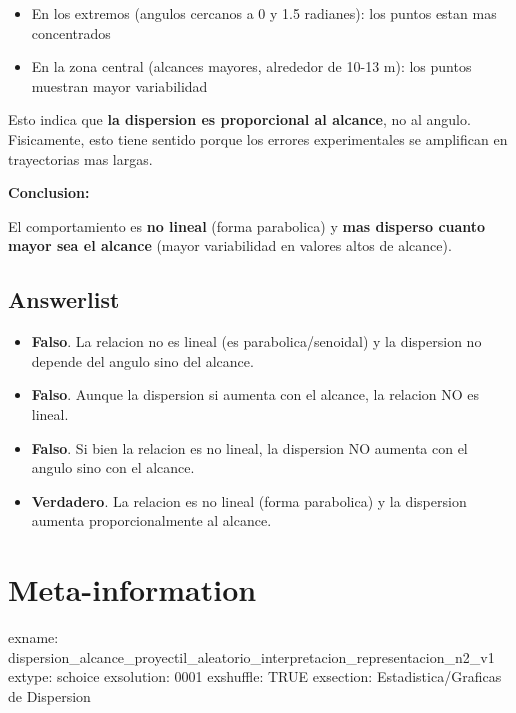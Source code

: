 \documentclass[
]{article}
\providecommand{\tightlist}{%
  \setlength{\itemsep}{0pt}\setlength{\parskip}{0pt}}
\begin{document}
\begin{itemize}
\tightlist
\item
  En los extremos (angulos cercanos a 0 y 1.5 radianes): los puntos
  estan mas concentrados
\item
  En la zona central (alcances mayores, alrededor de 10-13 m): los
  puntos muestran mayor variabilidad
\end{itemize}

Esto indica que \textbf{la dispersion es proporcional al alcance}, no al
angulo. Fisicamente, esto tiene sentido porque los errores
experimentales se amplifican en trayectorias mas largas.

\textbf{Conclusion:}

El comportamiento es \textbf{no lineal} (forma parabolica) y \textbf{mas
disperso cuanto mayor sea el alcance} (mayor variabilidad en valores
altos de alcance).

\subsection{Answerlist}\label{answerlist-1}

\begin{itemize}
\tightlist
\item
  \textbf{Falso}. La relacion no es lineal (es parabolica/senoidal) y la
  dispersion no depende del angulo sino del alcance.
\item
  \textbf{Falso}. Aunque la dispersion si aumenta con el alcance, la
  relacion NO es lineal.
\item
  \textbf{Falso}. Si bien la relacion es no lineal, la dispersion NO
  aumenta con el angulo sino con el alcance.
\item
  \textbf{Verdadero}. La relacion es no lineal (forma parabolica) y la
  dispersion aumenta proporcionalmente al alcance.
\end{itemize}

\section{Meta-information}\label{meta-information}

exname:
dispersion\_alcance\_proyectil\_aleatorio\_interpretacion\_representacion\_n2\_v1
extype: schoice exsolution: 0001 exshuffle: TRUE exsection:
Estadistica/Graficas de Dispersion
\end{document}

